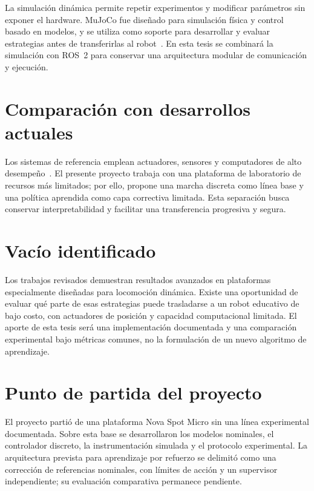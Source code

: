 La simulación dinámica permite repetir experimentos y modificar parámetros sin exponer el hardware. MuJoCo fue diseñado para simulación física y control basado en modelos, y se utiliza como soporte para desarrollar y evaluar estrategias antes de transferirlas al robot~\cite{todorov2012mujoco,tassa2018controlsuite}. En esta tesis se combinará la simulación con ROS~2 para conservar una arquitectura modular de comunicación y ejecución.

\section{Comparación con desarrollos actuales}

Los sistemas de referencia emplean actuadores, sensores y computadores de alto desempeño~\cite{bledt2018cheetah3,hutter2016anymal}. El presente proyecto trabaja con una plataforma de laboratorio de recursos más limitados; por ello, propone una marcha discreta como línea base y una política aprendida como capa correctiva limitada. Esta separación busca conservar interpretabilidad y facilitar una transferencia progresiva y segura.

\section{Vacío identificado}

Los trabajos revisados demuestran resultados avanzados en plataformas especialmente diseñadas para locomoción dinámica. Existe una oportunidad de evaluar qué parte de esas estrategias puede trasladarse a un robot educativo de bajo costo, con actuadores de posición y capacidad computacional limitada. El aporte de esta tesis será una implementación documentada y una comparación experimental bajo métricas comunes, no la formulación de un nuevo algoritmo de aprendizaje.

\section{Punto de partida del proyecto}

El proyecto partió de una plataforma Nova Spot Micro sin una línea experimental
documentada. Sobre esta base se desarrollaron los modelos nominales, el
controlador discreto, la instrumentación simulada y el protocolo experimental.
La arquitectura prevista para aprendizaje por refuerzo se delimitó como una
corrección de referencias nominales, con límites de acción y un supervisor
independiente; su evaluación comparativa permanece pendiente.
